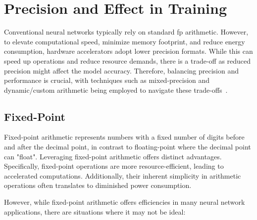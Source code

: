 \section{Precision and Effect in Training}

Conventional neural networks typically rely on standard \gls{fp} arithmetic. However, to elevate computational speed, minimize memory footprint, and reduce energy consumption, hardware accelerators adopt lower precision formats. While this can speed up operations and reduce resource demands, there is a trade-off as reduced precision might affect the model accuracy. Therefore, balancing precision and performance is crucial, with techniques such as mixed-precision and dynamic/custom arithmetic being employed to navigate these trade-offs~\cite{micikevicius2017mixed}.

\subsection{Fixed-Point}

Fixed-point arithmetic represents numbers with a fixed number of digits before and after the decimal point, in contrast to floating-point where the decimal point can "float". Leveraging fixed-point arithmetic offers distinct advantages. Specifically, fixed-point operations are more resource-efficient, leading to accelerated computations. Additionally, their inherent simplicity in arithmetic operations often translates to diminished power consumption. 


However, while fixed-point arithmetic offers efficiencies in many neural network applications, there are situations where it may not be ideal:

